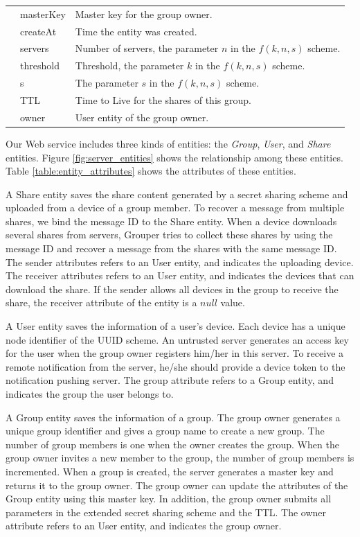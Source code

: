\documentclass[a4paper,11pt]{report}
\begin{document}
\begin{table}[t]
\begin{tabular}{@{}lll@{}}
		& masterKey & Master key for the group owner. \\
		& createAt & Time the entity was created. \\
		& servers & Number of servers, the parameter $n$ in the $f(k, n, s)$ scheme. \\
		& threshold & Threshold, the parameter $k$ in the $f(k, n, s)$ scheme. \\
		& s & The parameter $s$ in the $f(k, n, s)$ scheme.  \\
		& TTL & Time to Live for the shares of this group.  \\
		& owner & User entity of the group owner. \\ 
		\bottomrule
	\end{tabular}
\end{table}

Our Web service includes three kinds of entities: the \emph{Group}, \emph{User}, and \emph{Share} entities.
Figure \ref{fig:server_entities} shows the relationship among these entities.
Table \ref{table:entity_attributes} shows the attributes of these entities.

A Share entity saves the share content generated by a secret sharing scheme and uploaded from a device of a group member.
To recover a message from multiple shares, we bind the message ID to the Share entity.
When a device downloads several shares from servers, Grouper tries to collect these shares by using the message ID and recover a message from the shares with the same message ID.
The sender attributes refers to an User entity, and indicates the uploading device.
The receiver attributes refers to an User entity, and indicates the devices that can download the share.
If the sender allows all devices in the group to receive the share, the receiver attribute of the entity is a $null$ value.

A User entity saves the information of a user's device.
Each device has a unique node identifier of the UUID scheme.
An untrusted server generates an access key for the user when the group owner registers him/her in this server.
To receive a remote notification from the server, he/she should provide a device token to the notification pushing server.
The group attribute refers to a Group entity, and indicates the group the user belongs to.

A Group entity saves the information of a group.
The group owner generates a unique group identifier and gives a group name to create a new group.
The number of group members is one when the owner creates the group.
When the group owner invites a new member to the group, the number of group members is incremented.
When a group is created, the server generates a master key and returns it to the group owner.
The group owner can update the attributes of the Group entity using this master key.
In addition, the group owner submits all parameters in the extended secret sharing scheme and the TTL.
The owner attribute refers to an User entity, and indicates the group owner.
\end{document}
